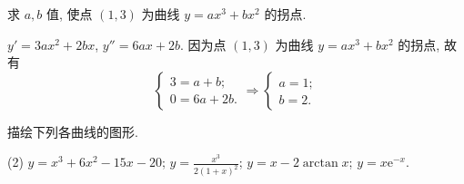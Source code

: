 \begin{exercise}[3.5.9]
    求 $a, b$ 值, 使点 $(1, 3)$ 为曲线 $y = ax^3 + bx^2$ 的拐点.
\end{exercise}

\begin{solution}
    $y' = 3ax^2 + 2bx$, $y'' = 6ax + 2b$. 因为点 $(1, 3)$ 为曲线 $y = ax^3 + bx^2$ 的拐点, 故有
    $$\begin{cases}
            3 = a + b; \\
            0 = 6a + 2b.
        \end{cases} \Rightarrow \begin{cases}
            a = 1; \\
            b = 2.
        \end{cases}$$
\end{solution}

\begin{exercise}[3.5.10]
    描绘下列各曲线的图形.
    \begin{tasks}(2)
        \task $y = x^3 + 6x^2 - 15x - 20$;
        \task $y = \frac{x^3}{2(1 + x)^2}$;
        \task $y = x - 2 \arctan x$;
        \task $y = x \mathrm{e}^{-x}$.
    \end{tasks}
\end{exercise}

